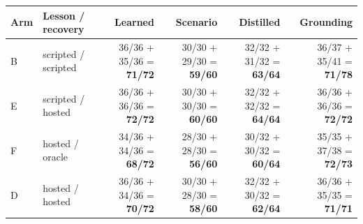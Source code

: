 \begin{tabular}{llrrrr}
\toprule
Arm & Lesson / recovery & Learned & Scenario & Distilled & Grounding\\
\midrule
B & scripted / scripted & 36/36 + 35/36 = \textbf{71/72} & 30/30 + 29/30 = \textbf{59/60} & 32/32 + 31/32 = \textbf{63/64} & 36/37 + 35/41 = \textbf{71/78}\\
E & scripted / hosted & 36/36 + 36/36 = \textbf{72/72} & 30/30 + 30/30 = \textbf{60/60} & 32/32 + 32/32 = \textbf{64/64} & 36/36 + 36/36 = \textbf{72/72}\\
F & hosted / oracle & 34/36 + 34/36 = \textbf{68/72} & 28/30 + 28/30 = \textbf{56/60} & 30/32 + 30/32 = \textbf{60/64} & 35/35 + 37/38 = \textbf{72/73}\\
D & hosted / hosted & 36/36 + 34/36 = \textbf{70/72} & 30/30 + 28/30 = \textbf{58/60} & 32/32 + 30/32 = \textbf{62/64} & 36/36 + 35/35 = \textbf{71/71}\\
\bottomrule
\end{tabular}
